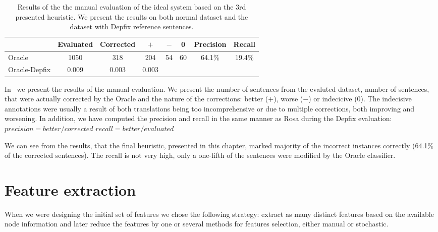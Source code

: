 \begin{table*}[t]
\centering
\small

\begin{tabular}{l|cc|ccc|cc}
  &  Evaluated  &  Corrected  &  $+$  &  $-$  &  0  &  Precision  &  Recall  \\
\hline
Oracle  &  1050  &  318  &  204  &  54  &  60  &  64.1\%  &  19.4\%  \\
Oracle-Depfix  & 0.009  &  0.003  &  0.003  &  &  &  &  \\
\end{tabular}
\caption{
Results of the the manual evaluation of the ideal system based on the 3rd
presented heuristic. We present the results on both normal dataset and
the
dataset with Depfix reference sentences.
}
\label{oracle-maneval}
\end{table*}

In~ we present the results of the manual evaluation.
We present the number of sentences from the evaluted dataset, number of sentences,
that were actually corrected by the Oracle and the nature of the corrections:
better ($+$), worse ($-$) or indecicive (0).
The indecisive annotations were usually a result of both translations being
too incomprehensive or due to multiple corrections, both improving and worsening.
In addition, we have computed the precision and recall in the same manner as Rosa during the Depfix evaluation:
$precision = better / corrected$
$recall = better / evaluated$

We can see from the results, that the final heuristic, presented in this chapter,
marked majority of the incorrect instances correctly (64.1\% of the corrected sentences).
The recall is not very high, only a one-fifth of the sentences were modified
by the Oracle classifier.



\section{Feature extraction}
\label{sec:feat_extract}



When we were designing the initial set of features we chose the following
strategy: extract as many distinct features based on the available node information
and later reduce the features by one or several methods
for features selection, either manual or stochastic.

